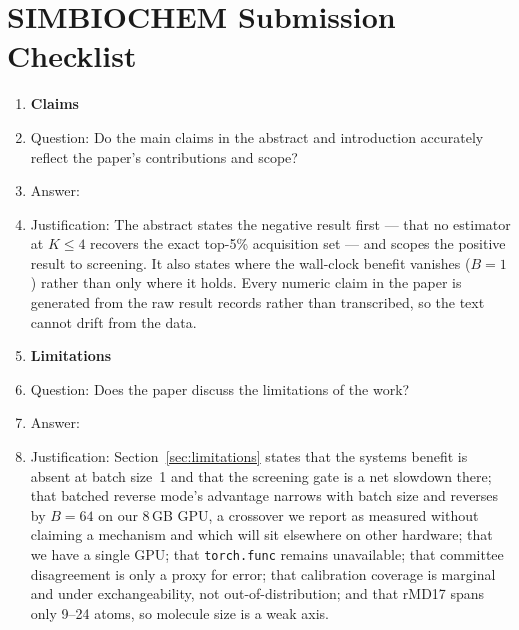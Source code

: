 \section*{SIMBIOCHEM Submission Checklist}

\begin{enumerate}

\item {\bf Claims}
    \item[] Question: Do the main claims in the abstract and introduction accurately reflect the paper's contributions and scope?
    \item[] Answer: \answerYes{}
    \item[] Justification: The abstract states the negative result first --- that no estimator at $K\le4$ recovers the exact top-5\% acquisition set --- and scopes the positive result to screening. It also states where the wall-clock benefit vanishes ($B{=}1$) rather than only where it holds. Every numeric claim in the paper is generated from the raw result records rather than transcribed, so the text cannot drift from the data.

\item {\bf Limitations}
    \item[] Question: Does the paper discuss the limitations of the work?
    \item[] Answer: \answerYes{}
    \item[] Justification: Section~\ref{sec:limitations} states that the systems benefit is absent at batch size~1 and that the screening gate is a net slowdown there; that batched reverse mode's advantage narrows with batch size and reverses by $B{=}64$ on our 8\,GB GPU, a crossover we report as measured without claiming a mechanism and which will sit elsewhere on other hardware; that we have a single GPU; that \texttt{torch.func} remains unavailable; that committee disagreement is only a proxy for error; that calibration coverage is marginal and under exchangeability, not out-of-distribution; and that rMD17 spans only 9--24 atoms, so molecule size is a weak axis.


\end{enumerate}
